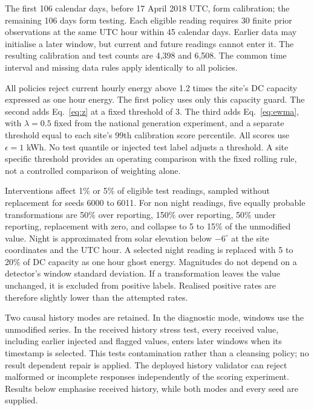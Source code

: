 \documentclass[11pt,a4paper]{article}
\begin{document}


The first 106 calendar days, before 17 April 2018 UTC, form calibration; the remaining 106 days form testing. Each eligible reading requires 30 finite prior observations at the same UTC hour within 45 calendar days. Earlier data may initialise a later window, but current and future readings cannot enter it. The resulting calibration and test counts are 4,398 and 6,508. The common time interval and missing data rules apply identically to all policies.



All policies reject current hourly energy above 1.2 times the site's DC capacity expressed as one hour energy. The first policy uses only this capacity guard. The second adds Eq.~\eqref{eq:z} at a fixed threshold of 3. The third adds Eq.~\eqref{eq:ewma}, with $\lambda=0.5$ fixed from the national generation experiment, and a separate threshold equal to each site's 99th calibration score percentile. All scores use $\epsilon=1$ kWh. No test quantile or injected test label adjusts a threshold. A site specific threshold provides an operating comparison with the fixed rolling rule, not a controlled comparison of weighting alone.

Interventions affect 1\% or 5\% of eligible test readings, sampled without replacement for seeds 6000 to 6011. For non night readings, five equally probable transformations are 50\% over reporting, 150\% over reporting, 50\% under reporting, replacement with zero, and collapse to 5 to 15\% of the unmodified value. Night is approximated from solar elevation below $-6^\circ$ at the site coordinates and the UTC hour. A selected night reading is replaced with 5 to 20\% of DC capacity as one hour ghost energy. Magnitudes do not depend on a detector's window standard deviation. If a transformation leaves the value unchanged, it is excluded from positive labels. Realised positive rates are therefore slightly lower than the attempted rates.

Two causal history modes are retained. In the diagnostic mode, windows use the unmodified series. In the received history stress test, every received value, including earlier injected and flagged values, enters later windows when its timestamp is selected. This tests contamination rather than a cleansing policy; no result dependent repair is applied. The deployed history validator can reject malformed or incomplete responses independently of the scoring experiment. Results below emphasise received history, while both modes and every seed are supplied.
\end{document}
